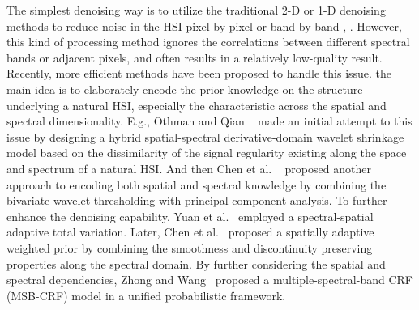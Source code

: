 \documentclass[journal]{IEEEtran}
\begin{document}
The simplest denoising way is to utilize the traditional 2-D or 1-D denoising methods to reduce noise in the HSI  pixel by pixel \cite{green1988transformation} or band by band  \cite{elad2006image,dabov2007image}, \cite{liu2016weighted,shao2014heuristic,yan2013nonlocal}.  However, this kind of processing method ignores the correlations between different spectral bands or adjacent pixels, and often results in a relatively low-quality result. Recently, more efficient methods have been proposed to handle this issue.  the main idea is to elaborately encode the prior knowledge on the structure underlying a natural HSI, especially the characteristic across the spatial and spectral dimensionality. E.g., Othman and Qian ~\cite{othman2006noise} made an initial attempt to this issue by designing a hybrid spatial-spectral derivative-domain wavelet shrinkage model based on the dissimilarity of the signal regularity existing along the space and spectrum of a natural HSI. And then Chen et al. ~\cite{chen2008simultaneous} proposed another approach to encoding both spatial and spectral knowledge  by combining the  bivariate wavelet thresholding with principal component analysis. To further enhance the denoising capability, Yuan et al.~\cite{yuan2012hyperspectral}  employed a spectral-spatial adaptive total variation. Later, Chen et al.~\cite{chen2012hyperspectral} proposed a spatially adaptive weighted prior by combining the smoothness and discontinuity preserving properties along the spectral domain. By further considering the spatial and spectral dependencies, Zhong and Wang~\cite{zhong2013multiple} proposed a multiple-spectral-band CRF (MSB-CRF) model in a unified probabilistic framework.
\end{document}
